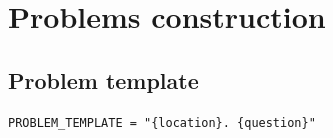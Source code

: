 \section[\appendixname~\thesection]{Problems construction}

\subsection[\appendixname~\thesubsection]{Problem template} \label{appendix:problem_template}

\begin{lstlisting}[breaklines, basicstyle=\ttfamily\small]
PROBLEM_TEMPLATE = "{location}. {question}"
\end{lstlisting}